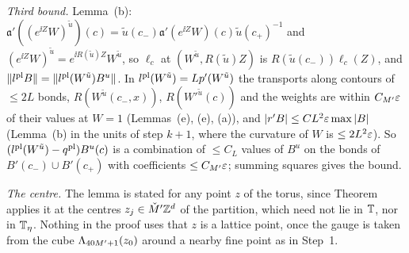 \begin{detail}
\begin{step}
\end{step}
\begin{step}
\emph{Third bound.} Lemma~(b): $\mathfrak a'((e^{\ii Z}W)^{\tilde u})(c)=\tilde u(c_-)\mathfrak a'(e^{\ii Z}W)(c)\tilde u(c_+)^{-1}$ and $(e^{\ii Z}W)^{\tilde u}=e^{\ii R(\tilde u)Z}W^{\tilde u}$, so $\ell_c$ at $(W^{\tilde u},R(\tilde u)Z)$ is $R(\tilde u(c_-))\ell_c(Z)$, and $\|l^{\rm pl}B\|=\|l^{\rm pl}(W^{\tilde u})B^u\|$. In $l^{\rm pl}(W^{\tilde u})=Lp'(W^{\tilde u})$ the transports along contours of $\le2L$ bonds, $R(W^{\tilde u}(c_-,x))$, $R(W'^{\tilde u}(c))$ and the weights are within $C_{M'}\varepsilon$ of their values at $W=1$ (Lemmas~(e), (e), (a)), and $|r'B|\le CL^2\varepsilon\max|B|$ (Lemma~(b) in the units of step $k+1$, where the curvature of $W$ is $\le2L^2\varepsilon$). So $(l^{\rm pl}(W^{\tilde u})-q^{\rm pl})B^u(c)$ is a combination of $\le C_L$ values of $B^u$ on the bonds of $B'(c_-)\cup B'(c_+)$ with coefficients $\le C_{M'}\varepsilon$; summing squares gives the bound.
\end{step}
\begin{step}
\emph{The centre.} The lemma is stated for any point $z$ of the torus, since Theorem~ applies it at the centres $z_j\in\check M'\mathbb Z^d$ of the partition, which need not lie in $\mathbb T$, nor in $\mathbb T_\eta$. Nothing in the proof uses that $z$ is a lattice point, once the gauge is taken from the cube $\Lambda_{40M'+1}(z_0)$ around a nearby fine point as in Step~1.
\end{step}
\end{detail}

